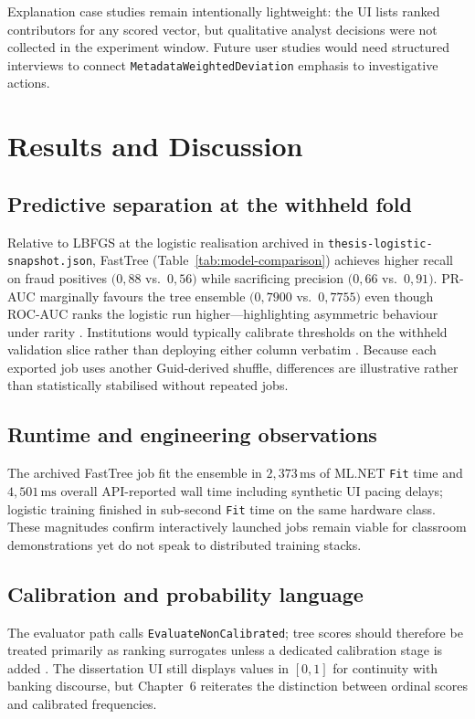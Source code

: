 Explanation case studies remain intentionally lightweight: the UI lists ranked contributors for any scored vector, but qualitative analyst decisions were not collected in the experiment window. Future user studies would need structured interviews to connect \texttt{MetadataWeightedDeviation} emphasis to investigative actions.

\section{Results and Discussion}
\label{sec:interpret-performance}

\subsection{Predictive separation at the withheld fold}
Relative to LBFGS at the logistic realisation archived in \texttt{thesis-logistic-snapshot.json}, FastTree (Table~\ref{tab:model-comparison}) achieves higher recall on fraud positives $(0{,}88$ vs.\ $0{,}56)$ while sacrificing precision $(0{,}66$ vs.\ $0{,}91)$. PR-AUC marginally favours the tree ensemble $(0{,}7900$ vs.\ $0{,}7755)$ even though ROC-AUC ranks the logistic run higher---highlighting asymmetric behaviour under rarity \cite{davis_goadrich_icml06}. Institutions would typically calibrate thresholds on the withheld validation slice rather than deploying either column verbatim \cite{fraud_handbook}. Because each exported job uses another Guid-derived shuffle, differences are illustrative rather than statistically stabilised without repeated jobs.

\subsection{Runtime and engineering observations}
The archived FastTree job fit the ensemble in $2{,}373\,\mathrm{ms}$ of ML.NET \texttt{Fit} time and $4{,}501\,\mathrm{ms}$ overall API-reported wall time including synthetic UI pacing delays; logistic training finished in sub-second \texttt{Fit} time on the same hardware class. These magnitudes confirm interactively launched jobs remain viable for classroom demonstrations yet do not speak to distributed training stacks.

\subsection{Calibration and probability language}
The evaluator path calls \texttt{EvaluateNonCalibrated}; tree scores should therefore be treated primarily as ranking surrogates unless a dedicated calibration stage is added \cite{niculescu_caruana_calib2005,molnarInterpretableMachineLearningBook}. The dissertation UI still displays values in $[0,1]$ for continuity with banking discourse, but Chapter~6 reiterates the distinction between ordinal scores and calibrated frequencies.

